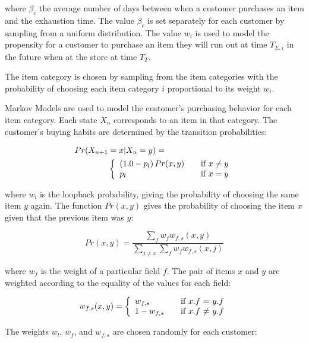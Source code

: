 where $\beta_c$ the average number of days between when a customer purchases an item and the exhaustion time. The value $\beta_c$ is set separately for each customer by sampling from a uniform distribution. The value $w_i$ is used to model the propensity for a customer to purchase an item they will run out at time $T_{E, i}$ in the future when at the store at time $T_T$.

The item category is chosen by sampling from the item categories with the probability of choosing each item category $i$ proportional to its weight $w_i$.

Markov Models are used to model the customer's purchasing behavior for each item category.  Each state $X_n$ corresponds to an item in that category. The customer's buying habits are determined by the transition probabilities:  

\begin{align}
Pr(X_{n+1}&=x|X_n=y) = \nonumber \\
& \left\{ 
  \begin{array}{l l}
   (1.0 - p_l) \, Pr(x,y)  & \quad \text{if $x \neq y$}\\
   p_l & \quad \text{if $x = y$}
  \end{array} \right.
\end{align}

where $w_l$ is the loopback probability, giving the probability of choosing the same item $y$ again. The function $Pr(x,y)$ gives the probability of choosing the item $x$ given that the previous item was $y$:

\begin{equation*}
Pr(x,y) = \frac{\sum_f w_f w_{f,s}(x, y)}{\sum_{j \neq x} \sum_f w_f w_{f,s}(x, j)}
\end{equation*}

where $w_f$ is the weight of a particular field $f$.   The pair of items $x$ and $y$ are weighted  according to the equality of the values for each field:

\begin{equation*}
w_{f,s}(x,y) = \left\{ 
  \begin{array}{l l}
   w_{f,s}  & \quad \text{if $x$.$f$ = $y$.$f$}\\
   1 - w_{f, s} & \quad \text{if $x$.$f$ $\neq$ $y$.$f$}
  \end{array} \right.
\end{equation*} 

The weights $w_l$, $w_f$, and $w_{f, s}$ are chosen randomly for each customer:

